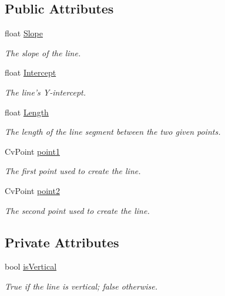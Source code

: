 \subsection*{Public Attributes}
\begin{DoxyCompactItemize}
\item 
float \hyperlink{classLines_1_1Line_a6f7ca43e76d34c90709495ef2daa631a}{Slope}
\begin{DoxyCompactList}\small\item\em The slope of the line. \item\end{DoxyCompactList}\item 
float \hyperlink{classLines_1_1Line_a61365108d69be8b700fa912b09c5ad41}{Intercept}
\begin{DoxyCompactList}\small\item\em The line's Y-\/intercept. \item\end{DoxyCompactList}\item 
float \hyperlink{classLines_1_1Line_a8f9ad3f6b37acb856d3f7781d163ab48}{Length}
\begin{DoxyCompactList}\small\item\em The length of the line segment between the two given points. \item\end{DoxyCompactList}\item 
CvPoint \hyperlink{classLines_1_1Line_a94abfd90c052a5486d09a8c1333d11bc}{point1}
\begin{DoxyCompactList}\small\item\em The first point used to create the line. \item\end{DoxyCompactList}\item 
CvPoint \hyperlink{classLines_1_1Line_ad6404e7f19ae9a7fc62300249b12662f}{point2}
\begin{DoxyCompactList}\small\item\em The second point used to create the line. \item\end{DoxyCompactList}\end{DoxyCompactItemize}
\subsection*{Private Attributes}
\begin{DoxyCompactItemize}
\item 
bool \hyperlink{classLines_1_1Line_aa150ea0e90c00de939de94d579fd97c0}{isVertical}
\begin{DoxyCompactList}\small\item\em True if the line is vertical; false otherwise. \item\end{DoxyCompactList}\end{DoxyCompactItemize}


